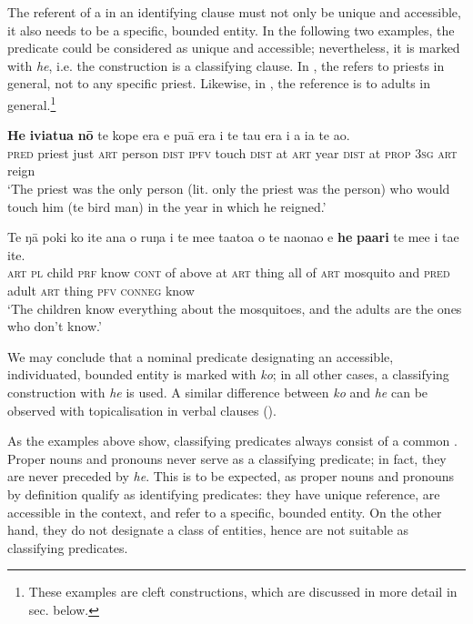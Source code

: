 The referent of a  in an identifying clause must not only be unique and accessible, it also needs to be a specific, bounded entity. In the following two examples, the predicate  could be considered as unique and accessible; nevertheless, it is marked with \textit{he}, i.e. the construction is a classifying clause. In , the  refers to priests in general, not to any specific priest. Likewise, in , the reference is to adults in general.\footnote{\label{fn:466}These examples are cleft constructions, which are discussed in more detail in sec.  below.}

\ea\label{ex:9.25}
\gll \textbf{He} \textbf{ivi{\ꞌ}atua} \textbf{nō} te kope era e puā era {\ꞌ}i te ta{\ꞌ}u era i a ia te {\ꞌ}ao. \\
\textsc{pred} priest just \textsc{art} person \textsc{dist} \textsc{ipfv} touch \textsc{dist} at \textsc{art} year \textsc{dist} at \textsc{prop} \textsc{3sg} \textsc{art} reign \\

\glt 
‘The priest was the only person (lit. only the priest was the person) who would touch him (te bird man) in the year in which he reigned.’ \textstyleExampleref{[R641.008]} 
\z

\ea\label{ex:9.26}
\gll Te ŋā poki ko {\ꞌ}ite {\ꞌ}ana o ruŋa i te me{\ꞌ}e ta{\ꞌ}ato{\ꞌ}a o te naonao {\ꞌ}e \textbf{he} \textbf{pa{\ꞌ}ari} te me{\ꞌ}e i ta{\ꞌ}e {\ꞌ}ite. \\
\textsc{art} \textsc{pl} child \textsc{prf} know \textsc{cont} of above at \textsc{art} thing all of \textsc{art} mosquito and \textsc{pred} adult \textsc{art} thing \textsc{pfv} \textsc{conneg} know \\

\glt 
‘The children know everything about the mosquitoes, and the adults are the ones who don’t know.’ \textstyleExampleref{[R535.159]} 
\z

We may conclude that a nominal predicate designating an accessible, individuated, bounded entity is marked with \textit{ko}; in all other cases, a classifying construction with \textit{he} is used. A similar difference between \textit{ko} and \textit{he} can be observed with topicalisation in verbal clauses ().

As the examples above show, classifying predicates always consist of a common . Proper nouns and pronouns never serve as a classifying predicate; in fact, they are never preceded by \textit{he}. This is to be expected, as proper nouns and pronouns by definition qualify as identifying predicates: they have unique reference, are accessible in the context, and refer to a specific, bounded entity. On the other hand, they do not designate a class of entities, hence are not suitable as classifying predicates.

